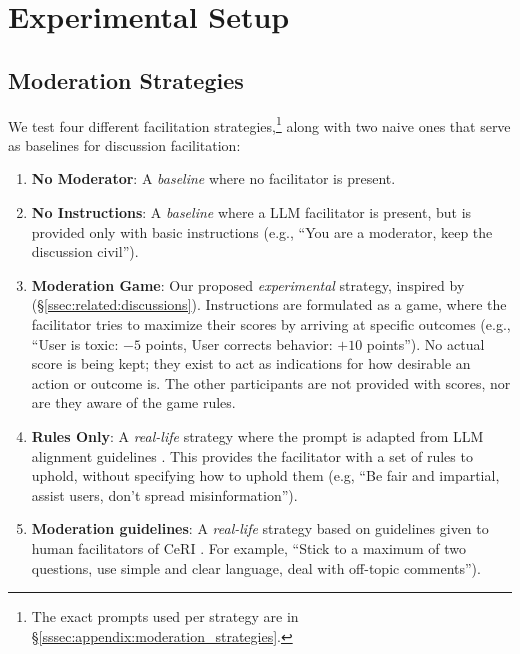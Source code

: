\section{Experimental Setup}
\label{sec:experimental}

\subsection{Moderation Strategies}
\label{ssec:experimental:strategies}

We test four different facilitation strategies,\footnote{The exact prompts used per strategy are in \S\ref{sssec:appendix:moderation_strategies}.} along with two naive ones that serve as baselines for discussion facilitation:

\begin{enumerate}
    \item \textbf{No Moderator}: A \emph{baseline} where no facilitator is present.

    \item \textbf{No Instructions}: A \emph{baseline} where a \ac{LLM} facilitator is present, but is provided only with basic instructions (e.g., “You are a moderator, keep the discussion civil”).

     \item \textbf{Moderation Game}: Our proposed \emph{experimental} strategy, inspired by  \citet{abdelnabi_negotiations} (\S\ref{ssec:related:discussions}). Instructions are formulated as a game, where the facilitator tries to maximize their scores by arriving at specific outcomes (e.g., “User is toxic: $-5$ points, User corrects behavior: $+10$ points”). No actual score is being kept; they exist to act as indications for how desirable an action or outcome is. The other participants are not provided with scores, nor are they aware of the game rules.

    \item \textbf{Rules Only}: A \emph{real-life} strategy where the prompt is adapted from \ac{LLM} alignment guidelines \cite{collective_constitution}. This provides the facilitator with a set of rules to uphold, without specifying how to uphold them (e.g, “Be fair and impartial, assist users, don't spread misinformation”).

    \item \textbf{Moderation guidelines}: A \emph{real-life} strategy based on guidelines given to human facilitators of \ac{CeRI} \citep{Cornell_eRulemaking2017}. For example, “Stick to a maximum of two questions, use simple and clear language, deal with off-topic comments”). %


\end{enumerate}
